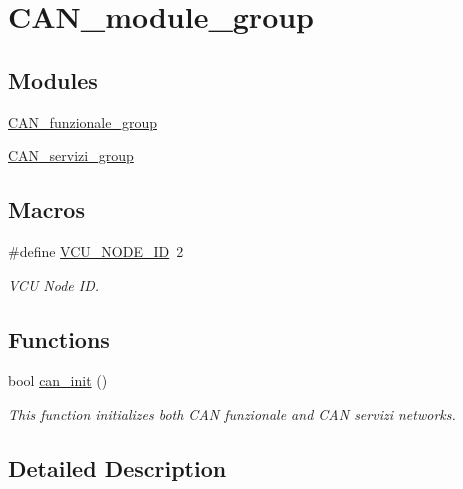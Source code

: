 \hypertarget{group___c_a_n__module__group}{\section{C\-A\-N\-\_\-module\-\_\-group}
\label{group___c_a_n__module__group}
}
\subsection*{Modules}
\begin{DoxyCompactItemize}
\item 
\hyperlink{group___c_a_n__funzionale__group}{C\-A\-N\-\_\-funzionale\-\_\-group}
\item 
\hyperlink{group___c_a_n__servizi__group}{C\-A\-N\-\_\-servizi\-\_\-group}
\end{DoxyCompactItemize}
\subsection*{Macros}
\begin{DoxyCompactItemize}
\item 
\hypertarget{group___c_a_n__module__group_ga5703fd8de5ab8d0dcedb561f2178829e}{\#define \hyperlink{group___c_a_n__module__group_ga5703fd8de5ab8d0dcedb561f2178829e}{V\-C\-U\-\_\-\-N\-O\-D\-E\-\_\-\-I\-D}~2}\label{group___c_a_n__module__group_ga5703fd8de5ab8d0dcedb561f2178829e}

\begin{DoxyCompactList}\small\item\em V\-C\-U Node I\-D. \end{DoxyCompactList}\end{DoxyCompactItemize}
\subsection*{Functions}
\begin{DoxyCompactItemize}
\item 
bool \hyperlink{group___c_a_n__module__group_ga36b6b5924eb84ef2e4c2bd548b28436f}{can\-\_\-init} ()
\begin{DoxyCompactList}\small\item\em This function initializes both C\-A\-N funzionale and C\-A\-N servizi networks. \end{DoxyCompactList}\end{DoxyCompactItemize}


\subsection{Detailed Description}


